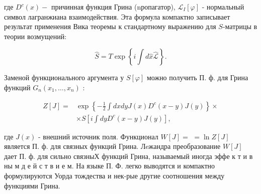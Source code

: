 \documentclass[10pt]{article}
\begin{document}
где $D^{c}(x)-$ причинная функция Грина (nропагатор), $\mathscr{L}_{I}[\varphi]$ - нормальный символ лагранжиана взаимодействия. Эта формула компактно записывает результат применения Вика теоремы к стандартному выражению для $S$-матрицы в теории возмущений:



\[

\hat{S}=T \exp \left\{i \int d \hat{x} \hat{\mathscr{L}}\right\} .

\]



Заменой функционального аргумента у $S[\varphi]$ можно получить П. ф. для Грина функций $G_{n}\left(x_{1}, \ldots, x_{n}\right)$ :



\[

\begin{aligned}

Z[J]= & \exp \left\{-\frac{1}{2} \int d x d y J(x) D^{c}(x-y) J(y)\right\} \times \\

& \times S\left[i \int d y D^{c}(x-y) J(y)\right],

\end{aligned}

\]



где $J(x)$ - внешний источник поля. Функционал $W[J]=$ $=\ln Z[J]$ является П. ф. для связных функций Грина. Лeжандра преобразование $W[J]$ дает П. ф. для сильно связныХ функций Грина, называемый иногда эффе к т и в ны м д е й с т в и е м. На языке П. Ф. легко выводятся и компактно формулируются Уорда тождества и нек-рые другие соотношения между функциями Грина.
\end{document}
